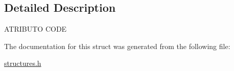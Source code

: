\subsection{Detailed Description}


 A\+T\+R\+I\+B\+U\+TO C\+O\+DE 

The documentation for this struct was generated from the following file\+:\begin{DoxyCompactItemize}
\item 
\mbox{\hyperlink{structures_8h}{structures.\+h}}\end{DoxyCompactItemize}
